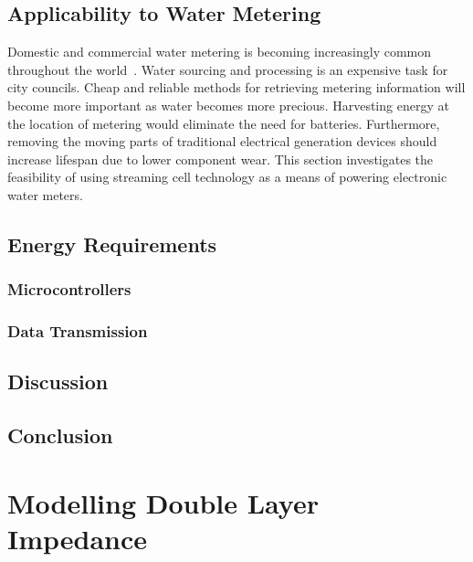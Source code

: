     

  \chapter{Applicability to Water Metering}
    \label{chap:wirelessWaterMetering}
    Domestic and commercial water metering is becoming increasingly common throughout the world~\cite{Chang2012}.
    Water sourcing and processing is an expensive task for city councils.
    Cheap and reliable methods for retrieving metering information will become more important as water becomes more precious.
    Harvesting energy at the location of metering would eliminate the need for batteries.
    Furthermore, removing the moving parts of traditional electrical generation devices should increase lifespan due to lower component wear.
    This section investigates the feasibility of using streaming cell technology as a means of powering electronic water meters.
    

  \chapter{Energy Requirements}
    \label{chap:energyRequirements}

    \section{Microcontrollers}

    \section{Data Transmission}
        

  \chapter{Discussion}
  \label{chap:part_1_discussion}

  \chapter{Conclusion}
  \label{chap:part_1_conclusion}


\part{Modelling Double Layer Impedance}
  \label{part:doubleLayersOnConductors}
